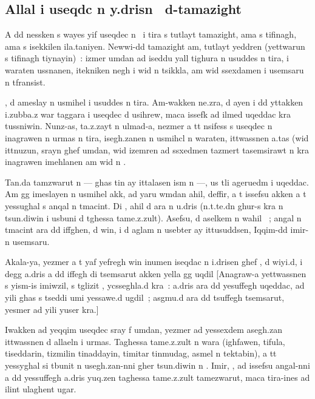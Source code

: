\documentclass[a4paper,11pt]{article}
\begin{document}
\subsection{Allal i useqdc n y.drisn \OMEGA\ d-tamazight}


A dd nessken s wayes yif useqdec n \OMEGA\ i tira s tutlayt tamazight,
ama s tifinagh, ama s isekkilen ila.taniyen. Newwi-dd tamazight am,
tutlayt yeddren (yettwarun s tifinagh tiynayin)~: izmer umdan ad
iseddu yall tighura n usuddes n tira, i waraten ussnanen, itekniken
negh i wid n tsikkla, am wid ssexdamen i usemsaru n tfransist.

\OMEGA, d ameslay n usmihel i usuddes n tira. Am-wakken ne.zra, d ayen
i dd yttakken i.zubba.z war taggara i useqdec d usihrew, maca issefk
ad ilmed uqeddac kra tussniwin. Nunz-as, ta.z.zayt n ulmad-a, nezmer a
tt nsifess s useqdec n inagrawen n urmas n tira, isegh.zanen n usmihcl
n waraten, ittwassnen a.tas (wid ittnuzun, srayn ghef umdan, wid
izemren ad ssxedmen tazmert tasemsirawt n kra inagrawen imehlanen am
wid n .

Tan.da tamzwarut n \OMEGA{} --- ghas tin ay ittalasen ism n \OMEGA{}
---, us tli ageruedm i uqeddac. Am gg imeslayen n usmihel akk, ad yaru
wmdan ahil, deffir, a t issefsu akken a t yessughal s anqal n
tmacint. Di \OMEGA{}, ahil d ara n u.dris (n.t.te.dn ghur-s kra n
tsun.diwin i usbuni d tghessa tame.z.zult).  Asefsu, d aselkem n wahil
\OMEGA~; angal n tmacint ara dd iffghen, d win, i d aglam n usebter ay
ittusuddsen, Iqqim-dd imir-n usemsaru.

Akala-ya, yezmer a t yaf yefregh win inumen iseqdac n i.drisen ghef
, d wiyi.d, i degg a.dris a dd iffegh di
tsemsarut akken yella gg uqdil [Anagraw-a yettwassnen s yism-is
imiwzil, s tglizit , ycsseghla.d kra~: a.dris
ara dd yesuffegh uqeddac, ad yili ghas s tseddi umi yessawe.d ugdil~;
asgmu.d ara dd tsuffegh tsemsarut, yesmer ad yili yuser kra.]

Iwakken ad yeqqim useqdec sray f umdan, yezmer ad yessexdem asegh.zan
ittwassnen d allaeln i urmas. Taghessa tame.z.zult n wara (ighfawen,
tifula, tiseddarin, tizmilin tinaddayin, timitar tinmudag, asmel n
tektabin), a tt yessyghal si tbunit n usegh.zan-nni gher tsun.diwin n
\OMEGA. Imir, \OMEGA, ad issefsu angal-nni a dd yessuffegh a.dris
yuq.zen taghessa tame.z.zult tamezwarut, maca tira-ines ad ilint
ulaghent ugar.  \popocplist
\end{document}
